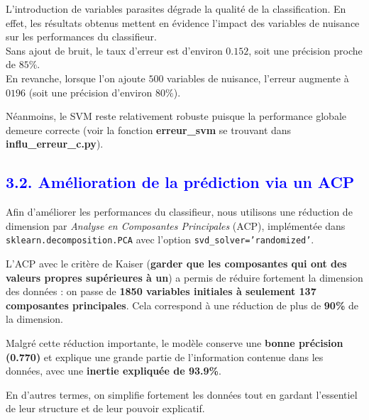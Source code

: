 \documentclass[
  12pt,
]{article}
\begin{document}
L'introduction de variables parasites dégrade la qualité de la
classification. En effet, les résultats obtenus mettent en évidence
l'impact des variables de nuisance sur les performances du
classifieur.\\
Sans ajout de bruit, le taux d'erreur est d'environ \(0.152\), soit une
précision proche de \(85\%\).\\
En revanche, lorsque l'on ajoute \(500\) variables de nuisance, l'erreur
augmente à \(0196\) (soit une précision d'environ \(80\%\)).

Néanmoins, le SVM reste relativement robuste puisque la performance
globale demeure correcte (voir la fonction \textbf{erreur\_svm} se
trouvant dans \textbf{influ\_erreur\_c.py}).

\subsection{\texorpdfstring{\textcolor{blue}{3.2. Amélioration de la prédiction via un ACP}}{}}\label{section-7}

Afin d'améliorer les performances du classifieur, nous utilisons une
réduction de dimension par \textit{Analyse en Composantes Principales}
(ACP), implémentée dans \texttt{sklearn.decomposition.PCA} avec l'option
\texttt{svd\_solver='randomized'}.

L'ACP avec le critère de Kaiser (\textbf{garder que les composantes qui
ont des valeurs propres supérieures à un}) a permis de réduire fortement
la dimension des données : on passe de
\textbf{1850 variables initiales à seulement 137 composantes principales}.
Cela correspond à une réduction de plus de \textbf{90\%} de la
dimension.

Malgré cette réduction importante, le modèle conserve une
\textbf{bonne précision (0.770)} et explique une grande partie de
l'information contenue dans les données, avec une
\textbf{inertie expliquée de 93.9\%}.

En d'autres termes, on simplifie fortement les données tout en gardant
l'essentiel de leur structure et de leur pouvoir explicatif.
\end{document}
